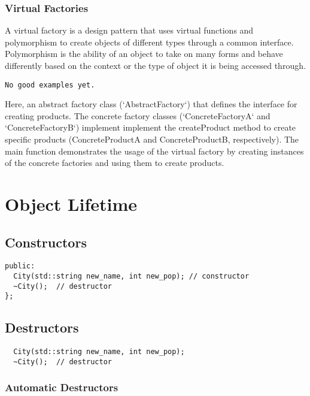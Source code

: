 \subsection{Virtual Factories}

A virtual factory is a design pattern that uses virtual functions and 
polymorphism to create objects of different types through a common interface.
Polymorphism is the ability of an object to take on many forms
and behave differently based on the context or the type of object it is being accessed through.

\begin{verbatim}
No good examples yet.
\end{verbatim}

Here, an abstract factory class (`AbstractFactory`) that defines the interface for creating products.
The concrete factory classes (`ConcreteFactoryA` and `ConcreteFactoryB`) implement
implement the createProduct method to create specific products (ConcreteProductA and ConcreteProductB, respectively).
The main function demonstrates the usage of 
the virtual factory by creating instances of the concrete factories and using them to create products.

\chapter{Object Lifetime}

\section{Constructors}

\begin{verbatim}
public:
  City(std::string new_name, int new_pop); // constructor
  ~City();  // destructor
};
\end{verbatim}

\section{Destructors}

\begin{verbatim}
  City(std::string new_name, int new_pop);
  ~City();  // destructor
\end{verbatim}

\subsection{Automatic Destructors}

